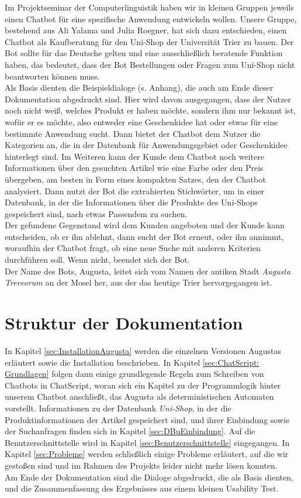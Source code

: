 Im Projektseminar der Computerlinguistik haben wir in kleinen Gruppen jeweils einen Chatbot für eine spezifische Anwendung entwickeln wollen. Unsere Gruppe, bestehend aus Ali Yalama und Julia Roegner, hat sich dazu entschieden, einen Chatbot als Kaufberatung für den Uni-Shop der Universität Trier zu bauen. Der Bot sollte für das Deutsche gelten und eine ausschließlich beratende Funktion haben, das bedeutet, dass der Bot Bestellungen oder Fragen zum Uni-Shop nicht beantworten können muss.\\
Als Basis dienten die Beispieldialoge (s. Anhang), die auch am Ende dieser Dokumentation abgedruckt sind. Hier wird davon ausgegangen, dass der Nutzer noch nicht weiß, welches Produkt er haben möchte, sondern ihm nur bekannt ist, wofür er es möchte, also entweder eine Geschenkidee hat oder etwas für eine bestimmte Anwendung sucht. Dann bietet der Chatbot dem Nutzer die Kategorien an, die in der Datenbank für Anwendungsgebiet oder Geschenkidee hinterlegt sind. Im Weiteren kann der Kunde dem Chatbot noch weitere Informationen über den gesuchten Artikel wie eine Farbe oder den Preis übergeben, am besten in Form eines kompakten Satzes, den der Chatbot analysiert. Dann nutzt der Bot die extrahierten Stichwörter, um in einer Datenbank, in der die Informationen über die Produkte des Uni-Shops gespeichert sind, nach etwas Passendem zu suchen.\\
Der gefundene Gegenstand wird dem Kunden angeboten und der Kunde kann entscheiden, ob er ihn ablehnt, dann sucht der Bot erneut, oder ihn annimmt, woraufhin der Chatbot fragt, ob eine neue Suche mit anderen Kriterien durchführen soll. Wenn nicht, beendet sich der Bot.\\
Der Name des Bots, Augusta, leitet sich vom Namen der antiken Stadt \textit{Augusta Treveorum} an der Mosel her, aus der das heutige Trier hervorgegangen ist.\\


\section{Struktur der Dokumentation}
\label{sec:Inhaltsbeschreibung} 
In Kapitel \ref{sec:InstallationAugusta} werden die einzelnen Versionen Augustas erläutert sowie die Installation beschrieben. In Kapitel \ref{sec:ChatScript: Grundlagen} folgen dann einige grundlegende Regeln zum Schreiben von Chatbots in ChatScript, woran sich ein Kapitel zu der Programmlogik hinter unserem Chatbot anschließt, das Augusta als deterministischen Automaten vorstellt. Informationen zu der Datenbank \textit{Uni-Shop}, in der die Produktinformationen der Artikel gespeichert sind, und ihrer Einbindung sowie der Suchanfragen finden sich in Kapitel \ref{sec:DBuEinbindung}. Auf die Benutzerschnittstelle wird in Kapitel \ref{sec:Benutzerschnittstelle} eingegangen. In Kapitel \ref{sec:Probleme} werden schließlich einige Probleme erläutert, auf die wir gestoßen sind und im Rahmen des Projekts leider nicht mehr lösen konnten.\\
Am Ende der Dokumentation sind die Dialoge abgedruckt, die als Basis dienten, und die Zusammenfassung des Ergebnisses aus einem kleinen Usability Test.

